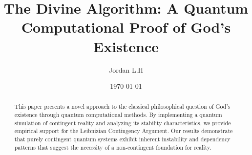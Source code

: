 \documentclass[12pt,a4paper]{article}
\title{The Divine Algorithm: A Quantum Computational Proof of God's Existence}
\author{Jordan L.H}
\date{\today}
\begin{document}
\maketitle

\begin{abstract}
This paper presents a novel approach to the classical philosophical question of God's existence through quantum computational methods. By implementing a quantum simulation of contingent reality and analyzing its stability characteristics, we provide empirical support for the Leibnizian Contingency Argument. Our results demonstrate that purely contingent quantum systems exhibit inherent instability and dependency patterns that suggest the necessity of a non-contingent foundation for reality.
\end{abstract}

\tableofcontents







\appendix


\printbibliography
\end{document}

